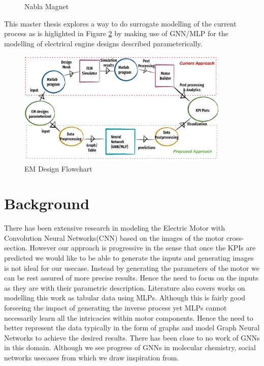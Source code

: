 \documentclass[a4paper,12pt]{article}
\begin{document}
\begin{figure}[h]
\begin{minipage}[b]{0.3\textwidth}
        \caption{Nabla Magnet}
        \label{fig:Nabla Magnet}
    \end{minipage}
\end{figure}

This master thesis explores a way to do surrogate modelling of the current process as is higlighted in Figure \ref{fig:EM Design Flowchart} by making use of GNN/MLP for the modelling of electrical engine designs described parameterically. \\
\begin{figure}[h]
    \centering
    \includegraphics[width=0.9\textwidth]{./ReportImages/EM_design_flowchart.png} 
    \caption{EM Design Flowchart}
    \label{fig:EM Design Flowchart}
\end{figure}

\newpage 

\section*{Background} 
There has been extensive research in modeling the Electric Motor with Convolution Neural Networks(CNN) based on the images of the motor cross-section. 
However our approach is progressive in the sense that once the KPIs are predicted we would like to be able to generate the inputs and generating images is not ideal for our usecase.
Instead by generating the parameters of the motor we can be rest assured of more precise results. Hence the need to focus on the inputs as they are with their parametric description.
Literature also covers works on modelling this work as tabular data using MLPs. Although this is fairly good forseeing the impact of generating the inverse process yet MLPs cannot necessarily learn all the intricacies within motor components.
Hence the need to better represent the data typically in the form of graphs and model Graph Neural Networks to achieve the desired results. There has been close to no work of GNNs in this domain.
Although we see progress of GNNs in molecular chemistry, social networks usecases from which we draw inspiration from.
\end{document}
